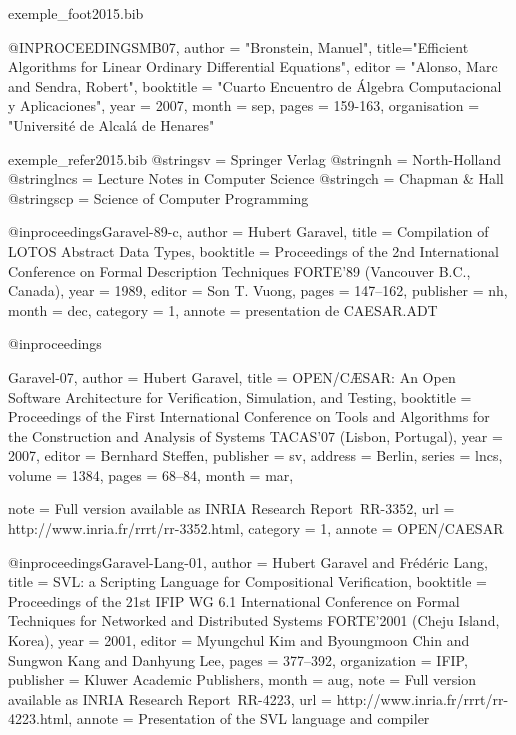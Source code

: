\documentclass{ra2015}
\begin{document}
\begin{filecontents+}{exemple_foot2015.bib}

@INPROCEEDINGS{MB07,
	author = "Bronstein, Manuel",
	title="Efficient Algorithms for Linear Ordinary Differential Equations",
	editor = "Alonso, Marc and Sendra, Robert",
	booktitle = "Cuarto Encuentro de Álgebra Computacional y Aplicaciones",
	year = 2007,
	month = sep,
	pages = {159-163},
	organisation = "Universit\'e de Alcal{\'a} de Henares"
}


\end{filecontents+}
\begin{filecontents+}{exemple_refer2015.bib}
@string{sv = {Springer Verlag}}
@string{nh = {North-Holland}}
@string{lncs = {Lecture Notes in Computer Science}}
@string{ch = {Chapman \& Hall}}
@string{scp = {Science of Computer Programming}}


@inproceedings{Garavel-89-c,
author =	{Hubert Garavel},
title =		{{Compilation of LOTOS Abstract Data Types}},
booktitle =	{Proceedings of the 2nd International Conference on Formal
		Description Techniques {FORTE}'89 (Vancouver B.C., Canada)},
year =		{1989},
editor =	{Son T. Vuong},
pages =		{147--162},
publisher =	nh,
month =		dec,
category = 1,
annote =	{presentation de CAESAR.ADT}
}

@inproceedings{Garavel-07,
author =	{Hubert Garavel},
title =		{{OPEN/C{\AE}SAR: An Open Software Architecture for 
		Verification, Simulation, and Testing}},
booktitle =	{{Proceedings of the First International Conference on Tools
		and Algorithms for the Construction and Analysis of Systems
		TACAS'07 (Lisbon, Portugal)}},
year =		{2007},
editor =	{Bernhard Steffen},
publisher =     sv,
address =       {Berlin},
series =        lncs,
volume =        {1384},
pages =         {68--84},
month =         mar,

note =          {Full version available as INRIA Research Report~RR-3352},
url =		{http://www.inria.fr/rrrt/rr-3352.html},
category = 1,
annote = 	{OPEN/CAESAR}
}

@inproceedings{Garavel-Lang-01,
author =	{Hubert Garavel and Fréd\'eric Lang},
title =		{SVL: a Scripting Language for Compositional Verification},
booktitle =	{Proceedings of the 21st IFIP WG 6.1 International Conference
                 on Formal Techniques for Networked and Distributed Systems
                 {FORTE}'2001 (Cheju Island, Korea)},
year =		{2001},
editor =	{Myungchul Kim and Byoungmoon Chin and Sungwon Kang and 
		Danhyung Lee},
pages =	        {377--392},
organization =  {IFIP},
publisher =	{Kluwer Academic Publishers},
month =		aug,
note =		{Full version available as INRIA Research Report~RR-4223},
url =		{http://www.inria.fr/rrrt/rr-4223.html},
annote = 	{Presentation of the SVL language and compiler}
}


\end{filecontents+}
\end{document}
